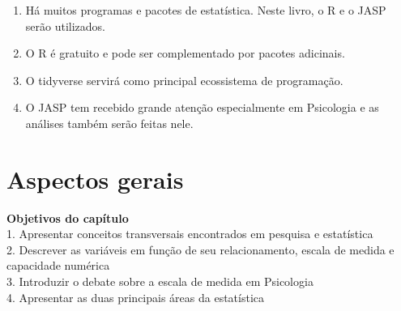 \documentclass[
]{book}
\providecommand{\tightlist}{%
  \setlength{\itemsep}{0pt}\setlength{\parskip}{0pt}}
\newenvironment{explore}{
  \definecolor{shadecolor}{rgb}{0, 0, 0}  %
  \color{white}
  \begin{shaded}}
 {\end{shaded}}
\newenvironment{objectives}{
  \definecolor{shadecolor}{rgb}{0, 0, 0}  %
  \color{white}
  \begin{shaded}}
 {\end{shaded}}
\begin{document}
\begin{explore}

\begin{enumerate}
\def\labelenumi{\arabic{enumi}.}
\tightlist
\item
  Há muitos programas e pacotes de estatística. Neste livro, o R e o JASP serão utilizados.\\
\item
  O R é gratuito e pode ser complementado por pacotes adicinais.\\
\item
  O tidyverse servirá como principal ecossistema de programação.\\
\item
  O JASP tem recebido grande atenção especialmente em Psicologia e as análises também serão feitas nele.\\
\end{enumerate}

\end{explore}

\hypertarget{aspectos-gerais}{%
\chapter{Aspectos gerais}\label{aspectos-gerais}}

\begin{objectives}

\textbf{Objetivos do capítulo}\\
1. Apresentar conceitos transversais encontrados em pesquisa e estatística\\
2. Descrever as variáveis em função de seu relacionamento, escala de medida e capacidade numérica\\
3. Introduzir o debate sobre a escala de medida em Psicologia\\
4. Apresentar as duas principais áreas da estatística

\end{objectives}
\end{document}

